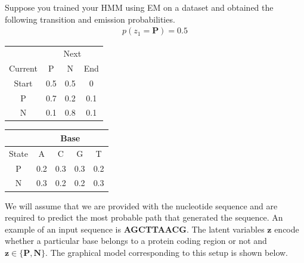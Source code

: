 \documentclass[11pt]{article}
\renewcommand{\vec}[1]{\mathbf{#1}}
\begin{document}
\begin{enumerate}[{(a)}]
Suppose you trained your HMM using EM on a dataset and obtained the following transition and emission probabilities. 
\begin{align}
    p(z_1 = \textbf{P}) = 0.5 \nonumber
\end{align}
\begin{tabular}{cccc}
                             & \multicolumn{3}{c}{Next}                                                       \\ \cline{2-4} 
\multicolumn{1}{c|}{Current} & P                        & N                        & \multicolumn{1}{c|}{End} \\ \hline
\multicolumn{1}{|c|}{Start} & \multicolumn{1}{c|}{0.5} & \multicolumn{1}{c|}{0.5} & \multicolumn{1}{c|}{0} \\
\multicolumn{1}{|c|}{P}      & \multicolumn{1}{c|}{0.7} & \multicolumn{1}{c|}{0.2} & \multicolumn{1}{c|}{0.1} \\
\multicolumn{1}{|c|}{N}      & \multicolumn{1}{c|}{0.1} & \multicolumn{1}{c|}{0.8} & \multicolumn{1}{c|}{0.1} \\ \hline
\end{tabular}
\qquad \qquad \qquad \qquad
\begin{tabular}{c|cccc|}
\cline{2-5}
                            & \multicolumn{4}{c|}{Base}                                                            \\ \hline
\multicolumn{1}{|c|}{State} & A                        & C                        & G                        & T   \\ \hline
\multicolumn{1}{|c|}{P}     & \multicolumn{1}{c|}{0.2} & \multicolumn{1}{c|}{0.3} & \multicolumn{1}{c|}{0.3} & 0.2 \\ \cline{2-5} 
\multicolumn{1}{|c|}{N}     & \multicolumn{1}{c|}{0.3} & \multicolumn{1}{c|}{0.2} & \multicolumn{1}{c|}{0.2} & 0.3 \\ \hline
\end{tabular}
\newline
\newline
\newline
We will assume that we are provided with the nucleotide sequence and are required to predict the most probable path that generated the sequence. 
An example of an input sequence is \textbf{AGCTTAACG}. The latent variables $\vec{z}$ encode whether a particular base belongs to a protein coding region or not and $\vec{z} \in \{\textbf{P}, \textbf{N}\}$. The graphical model corresponding to this setup is shown below. 
\begin{figure}[h]

\end{figure}
\end{enumerate}
\end{document}
